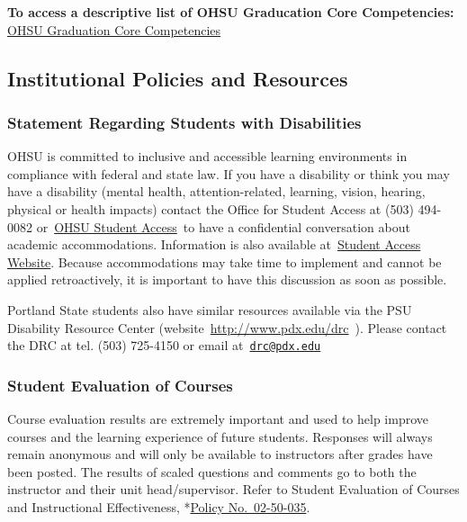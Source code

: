 \documentclass[
  letterpaper,
  DIV=11,
  numbers=noendperiod]{scrartcl}
\begin{document}
\textbf{To access a descriptive list of OHSU Graducation Core
Competencies:}
\href{https://www.ohsu.edu/sites/default/files/2020-11/OHSU\%20Graduation\%20Core\%20Competencies\%202020.pdf}{OHSU
Graduation Core Competencies}

\subsection{Institutional Policies and
Resources}\label{institutional-policies-and-resources}

\subsubsection{Statement Regarding Students with
Disabilities}\label{statement-regarding-students-with-disabilities}

OHSU is committed to inclusive and accessible learning environments in
compliance with federal and state law. If you have a disability or think
you may have a disability (mental health, attention-related, learning,
vision, hearing, physical or health impacts) contact the Office for
Student Access at (503) 494-0082
or~\href{mailto:studentaccess@ohsu.edu}{OHSU Student Access}~to have a
confidential conversation about academic accommodations. Information is
also available at~\href{http://www.ohsu.edu/student-access}{Student
Access Website}. Because accommodations may take time to implement and
cannot be applied retroactively, it is important to have this discussion
as soon as possible.

Portland State students also have similar resources available via the
PSU Disability Resource Center (website~\url{http://www.pdx.edu/drc}~).
Please contact the DRC at tel. (503) 725-4150 or email
at~\href{mailto:drc@pdx.edu}{\nolinkurl{drc@pdx.edu}}

\subsubsection{Student Evaluation of
Courses}\label{student-evaluation-of-courses}

Course evaluation results are extremely important and used to help
improve courses and the learning experience of future students.
Responses will always remain anonymous and will only be available to
instructors after grades have been posted. The results of scaled
questions and comments go to both the instructor and their unit
head/supervisor. Refer to Student Evaluation of Courses and
Instructional Effectiveness,
*\href{https://o2.ohsu.edu/policies-and-compliance/ohsu-policy-manual/chapter-2-student-affairs/ohsu-policy-02-50-035.cfm}{Policy
No.~02-50-035}.
\end{document}
